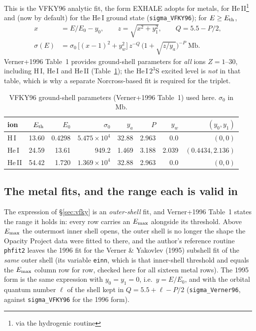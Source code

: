 \documentclass[english,a4paper]{my_memo}
\newcommand{\Mb}{\mathrm{Mb}}
\newcommand{\sig}{\sigma}
\begin{document}
This is the VFKY96 analytic fit, the form EXHALE adopts for metals, for
He\,II\footnote{via the hydrogenic routine} and (now by default) for
the He\,I ground state (\texttt{sigma\_VFKY96}); for $E\ge E_{\rm th}$,
\begin{align}
  x &= E/E_0 - y_0, \qquad z = \sqrt{x^2 + y_1^2}, \qquad
      Q = 5.5 - P/2, \\
  \sig(E) &= \sig_0\,\big[(x-1)^2 + y_w^2\big]\,
             z^{-Q}\,\big(1 + \sqrt{z/y_a}\big)^{-P}\;\Mb .
\end{align}
Verner+1996 Table~1 provides ground-shell parameters for \emph{all} ions
$Z=1$--$30$, including H\,I, He\,I and He\,II (Table~\ref{tab:vfky}); the
He\,I\,$2^3$S excited level is \emph{not} in that table, which is why a
separate Norcross-based fit is required for the triplet.

\begin{table}[h]
\centering
\caption{VFKY96 ground-shell parameters (Verner+1996 Table~1) used here.
$\sig_0$ in Mb.}
\label{tab:vfky}
\begin{tabular}{lrrrrrrr}
\toprule
ion & $E_{\rm th}$ & $E_0$ & $\sig_0$ & $y_a$ & $P$ & $y_w$ & $(y_0,y_1)$\\
\midrule
H\,I   & 13.60 & 0.4298 & $5.475\times10^4$ & 32.88 & 2.963 & 0.0   & $(0,0)$\\
He\,I  & 24.59 & 13.61  & 949.2             & 1.469 & 3.188 & 2.039 & $(0.4434,2.136)$\\
He\,II & 54.42 & 1.720  & $1.369\times10^4$ & 32.88 & 2.963 & 0.0   & $(0,0)$\\
\bottomrule
\end{tabular}
\end{table}

\subsection{The metal fits, and the range each is valid
in}\label{sec:metal-emax}

The expression of \S\ref{sec:vfky} is an \emph{outer-shell} fit, and
Verner+1996 Table~1 states the range it holds in: every row carries an
$E_{\rm max}$ alongside its threshold. Above $E_{\rm max}$ the outermost
inner shell opens, the outer shell is no longer the shape the Opacity
Project data were fitted to there, and the author's reference routine
\texttt{phfit2} leaves the 1996 fit for the Verner \& Yakovlev (1995)
subshell fit of the \emph{same} outer shell (its variable \texttt{einn},
which is that inner-shell threshold and equals the $E_{\rm max}$ column row
for row, checked here for all sixteen metal rows). The 1995 form is the same
expression with $y_0 = y_1 = 0$, i.e.\ $y = E/E_0$, and with the orbital
quantum number $\ell$ of the shell kept in $Q = 5.5 + \ell - P/2$
(\texttt{sigma\_Verner96}, against \texttt{sigma\_VFKY96} for the 1996 form).
\end{document}
